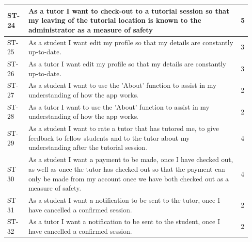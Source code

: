 \documentclass[12pt]{article}
\begin{document}
{\begin{longtable}{| l | p{10cm}| l |}
			\\ \hline ST-24 & As a tutor I want to check-out to a tutorial session so that my leaving of the tutorial location is known to the administrator as a measure of safety  &5


			\\ \hline ST-25 & As a student I want edit my profile so that my details are constantly up-to-date.  	 &3


			\\ \hline ST-26 & As a tutor I want edit my profile so that my details are constantly up-to-date.  &3

			\\ \hline ST-27 & As a student I want to use the 'About' function to assist in my understanding of how the app works.  &2

			\\ \hline ST-28 & As a tutor I want to use the 'About' function to assist in my understanding of how the app works.   &2

			\\ \hline ST-29 & As a student I want to rate a tutor that has tutored me, to give feedback to fellow students and to the tutor about my understanding after the tutorial session. &4

			\\ \hline ST-30 & As a student I want a payment to be made, once I have checked out, as well as once the tutor has checked out so that the payment can only be made from my account once we have both checked out as a measure of safety.  &4 
			
						\\ \hline ST-31 & As a student I want a notification to be sent to the tutor, once I have cancelled a confirmed session.  &2 
												\\ \hline ST-32 & As a tutor I want a notification to be sent to the student, once I have cancelled a confirmed session.  &2 \\ \hline
\end{longtable}
}
\end{document}
